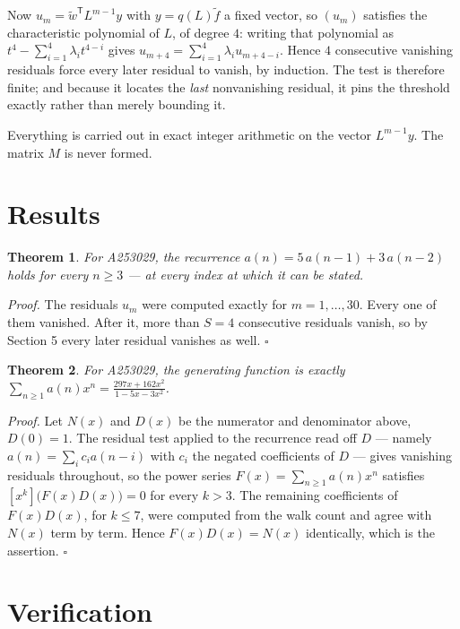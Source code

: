 \documentclass[11pt]{article}
\newtheorem{theorem}{Theorem}
\theoremstyle{definition}
\begin{document}
Now $u_m = \tilde w^{\mathsf T} L^{m-1} y$ with $y = q(L)\tilde f$ a fixed vector, so $(u_m)$ satisfies the characteristic polynomial of $L$, of degree $4$: writing that polynomial as $t^{4} - \sum_{i=1}^{4} \lambda_i t^{4-i}$ gives $u_{m+4} = \sum_{i=1}^{4} \lambda_i u_{m+4-i}$. Hence $4$ consecutive vanishing residuals force every later residual to vanish, by induction. The test is therefore finite; and because it locates the {\itshape last} nonvanishing residual, it pins the threshold exactly rather than merely bounding it.

Everything is carried out in exact integer arithmetic on the vector $L^{m-1}y$. The matrix $M$ is never formed.

\section{Results}

\begin{theorem} For A253029, the recurrence $a(n) = 5\,a(n-1) + 3\,a(n-2)$ holds for every $n \ge 3$ --- at every index at which it can be stated.\end{theorem}

{\itshape Proof.} The residuals $u_m$ were computed exactly for $m = 1,\dots,30$. Every one of them vanished. After it, more than $S = 4$ consecutive residuals vanish, so by Section 5 every later residual vanishes as well. $\square$

\begin{theorem} For A253029, the generating function is exactly $\sum_{n\ge 1} a(n)x^n = \frac{297x + 162x^{2}}{1 - 5x - 3x^{2}}$.\end{theorem}

{\itshape Proof.} Let $N(x)$ and $D(x)$ be the numerator and denominator above, $D(0)=1$. The residual test applied to the recurrence read off $D$ --- namely $a(n) = \sum_i c_i a(n-i)$ with $c_i$ the negated coefficients of $D$ --- gives vanishing residuals throughout, so the power series $F(x)=\sum_{n\ge 1}a(n)x^n$ satisfies $[x^k]\bigl(F(x)D(x)\bigr) = 0$ for every $k > 3$. The remaining coefficients of $F(x)D(x)$, for $k \le 7$, were computed from the walk count and agree with $N(x)$ term by term. Hence $F(x)D(x) = N(x)$ identically, which is the assertion. $\square$

\section{Verification}
\end{document}
